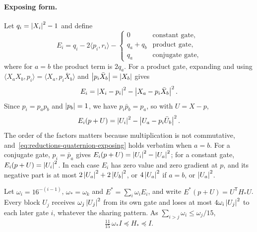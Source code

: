 \paragraph{Exposing form.}
Let $q_i=\left\lvert X_i\right\rvert^2-1$ and define
\[
 E_i=q_i-2\langle p_i,r_i\rangle-
 \begin{cases}0&\text{constant gate},\\ q_a+q_b&\text{product gate},\\
 q_a&\text{conjugate gate},\end{cases}
\]
where for $a=b$ the product term is $2q_a$. For a product gate, expanding
and using $\langle X_aX_b,p_i\rangle=\langle X_a,p_i\bar X_b\rangle$ and
$\left\lvert p_i\bar X_b\right\rvert=\left\lvert X_b\right\rvert$ gives
\[
 E_i=\left\lvert X_i-p_i\right\rvert^2-\left\lvert X_a-p_i\bar X_b\right\rvert^2 .
\]
Since $p_i=p_ap_b$ and $\left\lvert p_b\right\rvert=1$, we have $p_i\bar p_b=p_a$, so with
$U=X-p$,
\begin{equation}
 E_i(p+U)=\left\lvert U_i\right\rvert^2-\left\lvert U_a-p_i\bar U_b\right\rvert^2 .
 \label{eq:reductions-quaternion-exposing}
\end{equation}
The order of the factors matters because multiplication is not commutative,
and~\eqref{eq:reductions-quaternion-exposing} holds verbatim when $a=b$. For a
conjugate gate, $p_i=\bar p_a$ gives $E_i(p+U)=\left\lvert U_i\right\rvert^2-\left\lvert U_a\right\rvert^2$; for a
constant gate, $E_i(p+U)=\left\lvert U_i\right\rvert^2$. In each case $E_i$ has zero value and
zero gradient at $p$, and its negative part is at most
$2\left\lvert U_a\right\rvert^2+2\left\lvert U_b\right\rvert^2$, or $4\left\lvert U_a\right\rvert^2$ if $a=b$, or $\left\lvert U_a\right\rvert^2$.

Let $\omega_i=16^{-(i-1)}$, $\omega_*=\omega_k$ and $E^*=\sum_i\omega_iE_i$, and write
$E^*(p+U)=U^{\mathsf T}H_*U$. Every block $U_j$ receives $\omega_j\left\lvert U_j\right\rvert^2$ from
its own gate and loses at most $4\omega_i\left\lvert U_j\right\rvert^2$ to each later gate $i$,
whatever the sharing pattern. As $\sum_{i>j}\omega_i\le\omega_j/15$,
\[
 \tfrac{11}{15}\,\omega_*I\preceq H_*\preceq I .
\]

